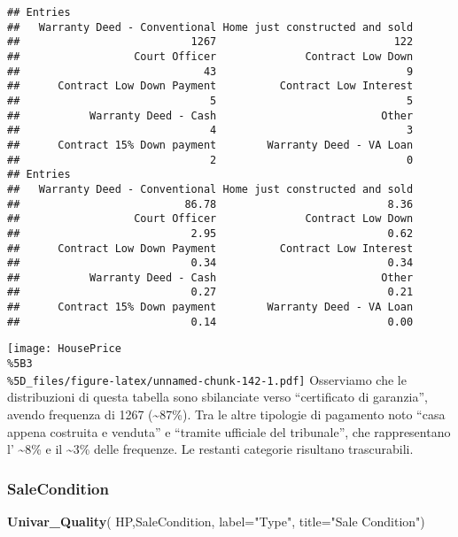 \documentclass[
]{article}
\newenvironment{Shaded}{\begin{snugshade}}{\end{snugshade}}
\newcommand{\AttributeTok}[1]{\textcolor[rgb]{0.13,0.29,0.53}{#1}}
\newcommand{\FunctionTok}[1]{\textcolor[rgb]{0.13,0.29,0.53}{\textbf{#1}}}
\newcommand{\NormalTok}[1]{#1}
\newcommand{\StringTok}[1]{\textcolor[rgb]{0.31,0.60,0.02}{#1}}
\begin{document}
\begin{verbatim}
## Entries
##   Warranty Deed - Conventional Home just constructed and sold 
##                           1267                            122 
##                  Court Officer              Contract Low Down 
##                             43                              9 
##      Contract Low Down Payment          Contract Low Interest 
##                              5                              5 
##           Warranty Deed - Cash                          Other 
##                              4                              3 
##      Contract 15% Down payment        Warranty Deed - VA Loan 
##                              2                              0 
## Entries
##   Warranty Deed - Conventional Home just constructed and sold 
##                          86.78                           8.36 
##                  Court Officer              Contract Low Down 
##                           2.95                           0.62 
##      Contract Low Down Payment          Contract Low Interest 
##                           0.34                           0.34 
##           Warranty Deed - Cash                          Other 
##                           0.27                           0.21 
##      Contract 15% Down payment        Warranty Deed - VA Loan 
##                           0.14                           0.00
\end{verbatim}

\texttt{[image: HousePrice\\\%5B3\\\%5D\_files/figure-latex/unnamed-chunk-142-1.pdf]}
Osserviamo che le distribuzioni di questa tabella sono sbilanciate verso
``certificato di garanzia'', avendo frequenza di 1267
(\textasciitilde87\%). Tra le altre tipologie di pagamento noto ``casa
appena costruita e venduta'' e ``tramite ufficiale del tribunale'', che
rappresentano l' \textasciitilde8\% e il \textasciitilde3\% delle
frequenze. Le restanti categorie risultano trascurabili.

\subsubsection{SaleCondition}\label{salecondition}

\begin{Shaded}
\begin{Highlighting}[]
\FunctionTok{Univar\_Quality}\NormalTok{(}
\NormalTok{  HP,SaleCondition,}
  \AttributeTok{label=}\StringTok{"Type"}\NormalTok{,}
  \AttributeTok{title=}\StringTok{"Sale Condition"}\NormalTok{)}
\end{Highlighting}
\end{Shaded}
\end{document}
